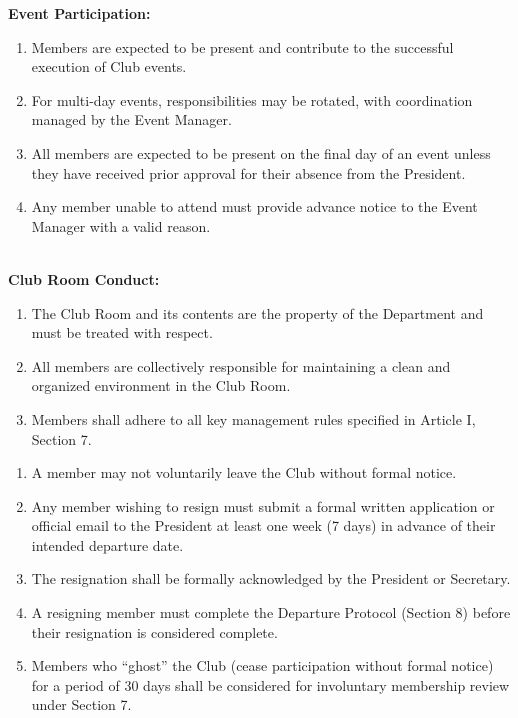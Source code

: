 \textbf{Event Participation:}
\begin{enumerate}[label=\alph*), leftmargin=2em, itemsep=0.3em]
    \item Members are expected to be present and contribute to the successful execution of Club events.
    \item For multi-day events, responsibilities may be rotated, with coordination managed by the Event Manager.
    \item All members are expected to be present on the final day of an event unless they have received prior approval for their absence from the President.
    \item Any member unable to attend must provide advance notice to the Event Manager with a valid reason.
\end{enumerate}
\\
\textbf{Club Room Conduct:}
\begin{enumerate}[label=\alph*), leftmargin=2em, itemsep=0.3em]
    \item The Club Room and its contents are the property of the Department and must be treated with respect.
    \item All members are collectively responsible for maintaining a clean and organized environment in the Club Room.
    \item Members shall adhere to all key management rules specified in Article I, Section 7.
\end{enumerate}


\begin{enumerate}[label=\alph*), leftmargin=2em, itemsep=0.3em]
    \item A member may not voluntarily leave the Club without formal notice.
    \item Any member wishing to resign must submit a formal written application or official email to the President at least one week (7 days) in advance of their intended departure date.
    \item The resignation shall be formally acknowledged by the President or Secretary.
    \item A resigning member must complete the Departure Protocol (Section 8) before their resignation is considered complete.
    \item Members who ``ghost'' the Club (cease participation without formal notice) for a period of 30 days shall be considered for involuntary membership review under Section 7.
\end{enumerate}

